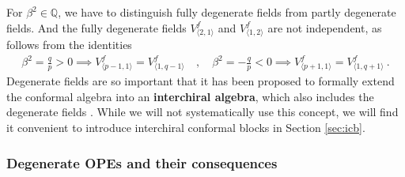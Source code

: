 \documentclass[12pt, a4paper]{article}
\theoremstyle{break}
\begin{document}
For $\beta^2\in\mathbb{Q}$, we have to distinguish fully degenerate fields from partly degenerate fields. And the fully degenerate fields $V^f_{\langle 2,1\rangle}$ and $V^f_{\langle 1,2\rangle}$ are not independent, as follows from the identities
\begin{align}
 \beta^2 =\frac{q}{p}>0 \implies V^f_{\langle p-1,1\rangle} = V^f_{\langle 1,q-1\rangle} \quad , \quad  \beta^2 =-\frac{q}{p}<0 \implies V^f_{\langle p+1,1\rangle} = V^f_{\langle 1,q+1\rangle}\ . 
\end{align}
Degenerate fields are so important that it has been proposed to formally extend the conformal algebra into an \textbf{interchiral algebra}, which also includes the degenerate fields \cite{grs12}. While we will not systematically use this concept, we will find it convenient to introduce interchiral conformal blocks in Section \ref{sec:icb}. 

\subsubsection{Degenerate OPEs and their consequences}
\end{document}
